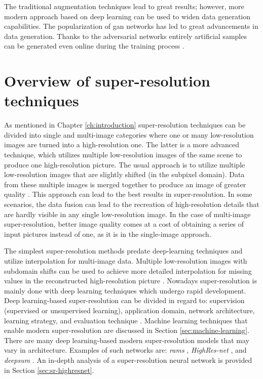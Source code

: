 The traditional augmentation techniques lead to great results; however, more modern approach based on deep learning can be used to widen data generation capabilities.
The popularization of \gls{gan} networks has led to great advancements in data generation.
Thanks to the adversarial networks entirely artificial samples can be generated \cite{sundaram-2021-gangen} even online during the training process \cite{bulat-2018-supergan}.

\section{Overview of super-resolution techniques}
As mentioned in Chapter \ref{ch:introduction} super-resolution techniques can be divided into single and multi-image categories where one or many low-resolution images are turned into a high-resolution one.
The latter is a more advanced technique, which utilizes multiple low-resolution
images of the same scene to produce one high-resolution picture.
The usual approach is to utilize multiple low-resolution images that are slightly shifted (in the subpixel domain).
Data from these multiple images is merged together to produce an image of greater quality \cite{kawulok-2019-multisr}.
This approach can lead to the best results in super-resolution.
In some scenarios, the data fusion can lead to the recreation of high-resolution details that are hardly visible in any single low-resolution image.
In the case of multi-image super-resolution, better image quality comes at a cost of obtaining a series of input pictures instead of one, as it is in the single-image approach.

The simplest super-resolution methods predate deep-learning techniques and utilize interpolation for multi-image data.
Multiple low-resolution images with subdomain shifts can be used to achieve more detailed interpolation for missing values in the reconstructed high-resolution picture \cite{park-2003-sr}.
Nowadays super-resolution is mainly done with deep learning techniques which undergo rapid development.
Deep learning-based super-resolution can be divided in regard to: supervision (supervised or unsupervised learning), application domain, network architecture, learning strategy, and evaluation technique \cite{wang-2019-srsurvey, bashir-2021-srreview}.
Machine learning techniques that enable modern super-resolution are discussed in Section \ref{sec:machine-learning}.
There are many deep learning-based modern super-resolution models that may vary in architecture.
Examples of such networks are: \textit{\gls{rams}} \cite{salvetti-2020-rams}, \textit{HighRes-net} \cite{deudon-2020-highresnet}, and \textit{\gls{deepsum}} \cite{moloni-2020-deepsum}.
An in-depth analysis of a super-resolution neural network is provided in Section \ref{sec:sr-highresnet}.

